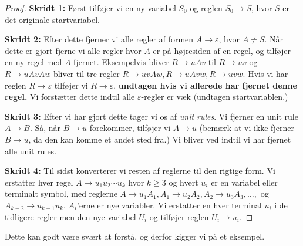 \begin{proof}
  \textbf{Skridt 1:} Først tilføjer vi en ny variabel $S_{0}$ og reglen $S_{0} \rightarrow S$, hvor $S$ er det originale startvariabel.

  \textbf{Skridt 2:} Efter dette fjerner vi alle regler af formen $A \rightarrow \varepsilon$, hvor $A \neq S$. Når dette er gjort fjerne vi alle regler hvor $A$ er på højresiden af en regel, og tilføjer en ny regel med $A$ fjernet. Eksempelvis bliver $R \rightarrow uAv$ til $R \rightarrow uv$ og $R \rightarrow uAvAw$ bliver til tre regler $R \rightarrow uvAw, R \rightarrow uAvw, R \rightarrow uvw$. Hvis vi har reglen $R \rightarrow \varepsilon$ tilføjer vi $R \rightarrow \varepsilon$, \textbf{undtagen hvis vi allerede har fjernet denne regel.} Vi forstætter dette indtil alle $\varepsilon$-regler er væk (undtagen startvariablen.)

  \textbf{Skridt 3:} Efter vi har gjort dette tager vi os af \textit{unit rules}. Vi fjerner en unit rule $A \rightarrow B$. Så, når $B \rightarrow u$ forekommer, tilføjer vi $A \rightarrow u$ (bemærk at vi ikke fjerner $B \rightarrow u$, da den kan komme et andet sted fra.) Vi bliver ved indtil vi har fjernet alle unit rules.

  \textbf{Skridt 4:} Til sidst konverterer vi resten af reglerne til den rigtige form. Vi erstatter hver regel $A \rightarrow u_{1}u_{2} \cdots u_{k}$ hvor $k \geq 3$ og hvert $u_{i}$ er en variabel eller terminalt symbol, med reglerne $A \rightarrow u_{1}A_{1}, A_{1} \rightarrow u_{2}A_{2}, A_{2} \rightarrow u_{3}A_{3}, \ldots, $ og $A_{k-2} \rightarrow u_{k-1}u_{k}$.  $A_{i}$'erne er nye variabler. Vi erstatter en hver terminal $u_{i}$ i de tidligere regler men den nye variabel $U_{i}$ og tilføjer reglen $U_{i} \rightarrow u_{i}$.
\end{proof}

Dette kan godt være svært at forstå, og derfor kigger vi på et eksempel.

